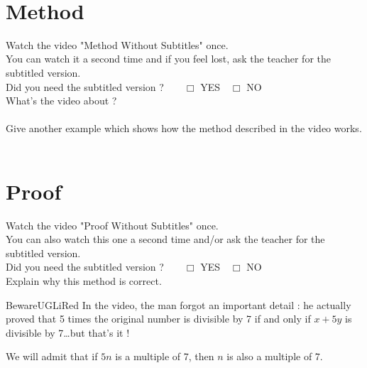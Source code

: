 \documentclass[12pt,a4paper,eval,english,firamath]{nsi}
\begin{document}
\maketitle

\ \\[-5em]
\section*{Method}
Watch the video "Method Without Subtitles" once.\\
You can watch it a second time and if you feel lost, ask the teacher for the subtitled version.\\

Did you need the subtitled version ?$\qquad\Box$ YES$\quad \Box$ NO\\

What's the video about ?\\

\\

Give another example which shows how the method described in the video works.\\

\\
\section*{Proof}
Watch the video "Proof Without Subtitles" once.\\
You can also watch this one a second time and/or ask the teacher for the subtitled version.\\

Did you need the subtitled version ?$\qquad\Box$ YES$\quad \Box$ NO\\

Explain why this method is correct.\\

\begin{encadrecolore}{Beware}{UGLiRed}
    In the video, the man forgot an important detail : he actually proved that 5 times the original number is divisible by 7 if and only if $x+5y$ is divisible by 7\ldots but that's it !
    
    We will admit that if  $5n$ is a multiple of 7,  then $n$ is also a multiple of 7.
\end{encadrecolore}

\end{document}
